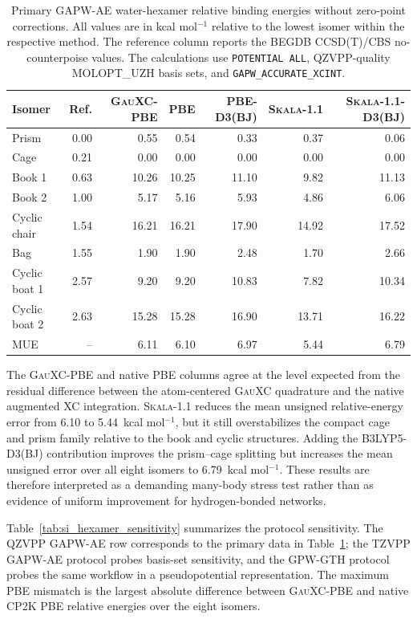 \documentclass[10pt]{article}
\newcommand{\Skala}{\textsc{Skala}}
\newcommand{\GauXC}{\textsc{GauXC}}
\newcommand{\CPtwoK}{\textsc{CP2K}}
\newcommand{\GPW}{\textsc{GPW}}
\newcommand{\GAPW}{\textsc{GAPW}}
\newcommand{\GTH}{\textsc{GTH}}
\newcommand{\GPWGTH}{\GPW{}-\GTH{}}
\newcommand{\GAPWAE}{\GAPW{}-AE}
\newcommand{\SITableFont}{\normalsize}
\begin{document}
\begin{table}[htbp]
\centering
\SITableFont
\setlength{\tabcolsep}{2pt}
\caption{Primary \GAPWAE{} water-hexamer relative binding energies without zero-point corrections.  All values are in kcal mol\(^{-1}\) relative to the lowest isomer within the respective method.  The reference column reports the BEGDB CCSD(T)/CBS no-counterpoise values.  The calculations use \texttt{POTENTIAL ALL}, QZVPP-quality \textsc{MOLOPT\_UZH} basis sets, and \texttt{GAPW\_ACCURATE\_XCINT}.}
\label{tab:si_hexamer_qzvpp}
\begin{tabular}{lrrrrrr}
\hline
Isomer & Ref. & \GauXC{}-PBE & PBE & PBE-D3(BJ) & \Skala{}-1.1 & \Skala{}-1.1-D3(BJ)\\
\hline
Prism & 0.00 & 0.55 & 0.54 & 0.33 & 0.37 & 0.06\\
Cage & 0.21 & 0.00 & 0.00 & 0.00 & 0.00 & 0.00\\
Book 1 & 0.63 & 10.26 & 10.25 & 11.10 & 9.82 & 11.13\\
Book 2 & 1.00 & 5.17 & 5.16 & 5.93 & 4.86 & 6.06\\
Cyclic chair & 1.54 & 16.21 & 16.21 & 17.90 & 14.92 & 17.52\\
Bag & 1.55 & 1.90 & 1.90 & 2.48 & 1.70 & 2.66\\
Cyclic boat 1 & 2.57 & 9.20 & 9.20 & 10.83 & 7.82 & 10.34\\
Cyclic boat 2 & 2.63 & 15.28 & 15.28 & 16.90 & 13.71 & 16.22\\
\hline
MUE & -- & 6.11 & 6.10 & 6.97 & 5.44 & 6.79\\
\hline
\end{tabular}
\end{table}

The \GauXC{}-PBE and native PBE columns agree at the level expected from the residual difference between the atom-centered \GauXC{} quadrature and the native augmented XC integration.  \Skala{}-1.1 reduces the mean unsigned relative-energy error from 6.10 to 5.44~kcal mol\(^{-1}\), but it still overstabilizes the compact cage and prism family relative to the book and cyclic structures.  Adding the B3LYP5-D3(BJ) contribution improves the prism--cage splitting but increases the mean unsigned error over all eight isomers to 6.79~kcal mol\(^{-1}\).  These results are therefore interpreted as a demanding many-body stress test rather than as evidence of uniform improvement for hydrogen-bonded networks.

Table~\ref{tab:si_hexamer_sensitivity} summarizes the protocol sensitivity.  The QZVPP \GAPWAE{} row corresponds to the primary data in Table~\ref{tab:si_hexamer_qzvpp}; the TZVPP \GAPWAE{} protocol probes basis-set sensitivity, and the \GPWGTH{} protocol probes the same workflow in a pseudopotential representation.  The maximum PBE mismatch is the largest absolute difference between \GauXC{}-PBE and native \CPtwoK{} PBE relative energies over the eight isomers.
\end{document}
